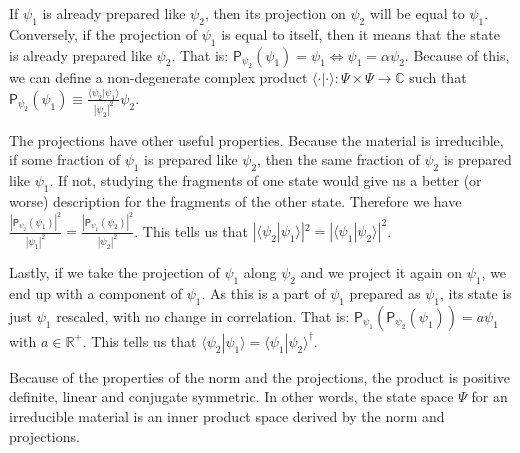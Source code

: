 \documentclass[smallextended]{svjour3}
\numberwithin{equation}{section}
\theoremstyle{definition}
\begin{document}
If $\psi_1$ is already prepared like $\psi_2$, then its projection on $\psi_2$ will be equal to $\psi_1$. Conversely, if the projection of $\psi_1$ is equal to itself, then it means that the state is already prepared like $\psi_2$. That is: $\mathsf{P}_{\psi_2} (\psi_1) = \psi_1 \Leftrightarrow \psi_1 = \alpha \psi_2$. Because of this, we can define a non-degenerate complex product $\langle \cdot |\cdot \rangle : \Psi \times \Psi \rightarrow \mathbb{C}$ such that $\mathsf{P}_{\psi_2} (\psi_1) \equiv \frac{\langle \psi_2|\psi_1 \rangle}{|\psi_2|^2} \psi_2$.

The projections have other useful properties. Because the material is irreducible, if some fraction of $\psi_1$ is prepared like $\psi_2$, then the same fraction of $\psi_2$ is prepared like $\psi_1$. If not, studying the fragments of one state would give us a better (or worse) description for the fragments of the other state. Therefore we have $\frac{|\mathsf{P}_{\psi_2} (\psi_1)|^2}{|\psi_1|^2}=\frac{|\mathsf{P}_{\psi_1} (\psi_2)|^2}{|\psi_2|^2}$. This tells us that $|\langle \psi_2|\psi_1 \rangle|^2 = |\langle \psi_1|\psi_2 \rangle|^2$.

Lastly, if we take the projection of $\psi_1$ along $\psi_2$ and we project it again on $\psi_1$, we end up with a component of $\psi_1$. As this is a part of $\psi_1$ prepared as $\psi_1$, its state is just $\psi_1$ rescaled, with no change in correlation. That is: $\mathsf{P}_{\psi_1} (\mathsf{P}_{\psi_2} (\psi_1)) = a \psi_1$ with $a \in \mathbb{R}^+$. This tells us that $\langle \psi_2|\psi_1 \rangle = \langle \psi_1|\psi_2 \rangle^\dagger$.

Because of the properties of the norm and the projections, the product is positive definite, linear and conjugate symmetric. In other words, the state space $\Psi$ for an irreducible material is an inner product space derived by the norm and projections.
 
\end{document}
